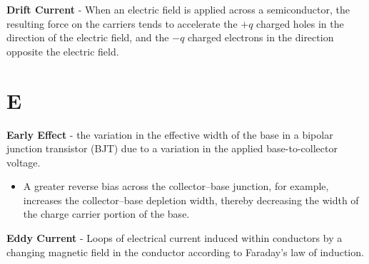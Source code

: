 \vspace{0.5cm}
    \textbf{Drift Current} - When an electric field is applied across a semiconductor, the resulting force on the carriers tends to accelerate the $+q$ charged holes in the direction of the electric field, and the $-q$ charged electrons in the direction opposite the electric field.
\section{E}
    \textbf{Early Effect} - the variation in the effective width of the base in a bipolar junction transistor (BJT) due to a variation in the applied base-to-collector voltage.
    \vspace{0.15cm}
    \begin{itemize}
        \setlength\itemsep{0.5em}
        \item{A greater reverse bias across the collector–base junction, for example, increases the collector–base depletion width, thereby decreasing the width of the charge carrier portion of the base.}
    \end{itemize}
\vspace{0.5cm}
    \textbf{Eddy Current} - Loops of electrical current induced within conductors by a changing magnetic field in the conductor according to Faraday's law of induction.

